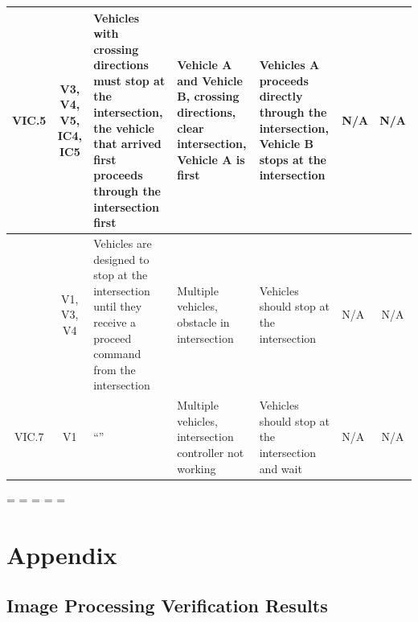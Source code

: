 \documentclass [10pt]{article}
\begin{document}
\begin{longtable}{ | p{ } | p{ } |  p{ } |  p{ } | p{ } | p{ } |  p{ } |}
    \multicolumn{1}{|c|}{VIC.5} 
    & \multicolumn{1}{c|}{V3, V4, V5, IC4, IC5}
    & Vehicles with crossing directions must stop at the intersection, the vehicle that arrived first proceeds through the intersection first
    &  Vehicle A and Vehicle B, crossing directions, clear intersection, Vehicle A is first
    &Vehicles A proceeds directly through the intersection, Vehicle B stops at the intersection 
    & N/A 
    & \multicolumn{1}{c|}{N/A}\\ \hline
    
    \rowcolor{tableCell}\multicolumn{1}{|c|}{VIC.6} 
    & \multicolumn{1}{c|}{V1, V3, V4}
    & Vehicles are designed to stop at the intersection until they receive a proceed command from the intersection
    & Multiple vehicles, obstacle in intersection
    & Vehicles should stop at the intersection 
    & N/A 
    & \multicolumn{1}{c|}{N/A}\\  \hline
    
    \multicolumn{1}{|c|}{VIC.7} 
    & \multicolumn{1}{c|}{V1}
    & ``''
    & Multiple vehicles, intersection controller not working
    &  Vehicles should stop at the intersection and wait
    & N/A 
    & \multicolumn{1}{c|}{N/A}\\ \hline
    \end{longtable}



\begin{landscape}
\end{landscape}
\endgroup





    
    
\newpage
\paperwidth=\pdfpageheight
\paperheight=\pdfpagewidth
\pdfpageheight=\paperheight
\pdfpagewidth=\paperwidth
\headwidth=\textwidth



 

\section{Appendix}
\subsection{Image Processing Verification Results}
\end{document}
